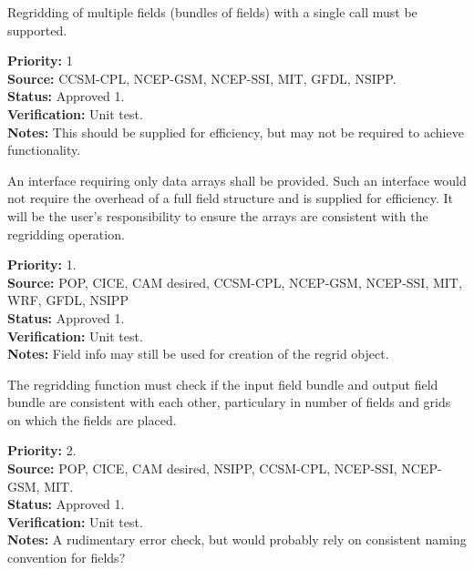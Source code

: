 Regridding of multiple fields (bundles of fields) with
a single call must be supported.

\begin{reqlist}
{\bf Priority:} 1  \\
{\bf Source:} CCSM-CPL, NCEP-GSM, NCEP-SSI, MIT, GFDL, NSIPP. \\
{\bf Status:} Approved 1. \\
{\bf Verification:} Unit test. \\
{\bf Notes:} This should be supplied for efficiency, but may not
             be required to achieve functionality.
\end{reqlist}


An interface requiring only data arrays shall be
provided.  Such an interface would not require the overhead
of a full field structure and is supplied for efficiency.
It will be the user's responsibility to ensure the arrays
are consistent with the regridding operation.

\begin{reqlist}
{\bf Priority:} 1. \\
{\bf Source:} POP, CICE, CAM desired, CCSM-CPL, NCEP-GSM, NCEP-SSI, MIT, WRF, GFDL, NSIPP \\
{\bf Status:} Approved 1. \\
{\bf Verification:} Unit test. \\
{\bf Notes:} Field info may still be used for creation of the
             regrid object.
\end{reqlist}


The regridding function must check if the input field bundle and output field
bundle are consistent with each other, particulary in number of fields 
and grids on which the fields are placed.

\begin{reqlist}
{\bf Priority:} 2. \\
{\bf Source:} POP, CICE, CAM desired, NSIPP, CCSM-CPL, NCEP-SSI, NCEP-GSM, MIT. \\
{\bf Status:} Approved 1. \\
{\bf Verification:} Unit test. \\
{\bf Notes:} A rudimentary error check, but would probably rely on
             consistent naming convention for fields?
\end{reqlist}


